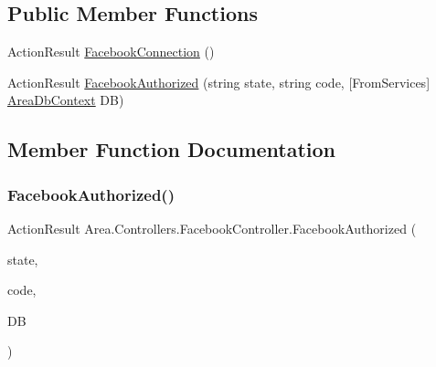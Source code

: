 \subsection*{Public Member Functions}
\begin{DoxyCompactItemize}
\item 
Action\+Result \mbox{\hyperlink{classArea_1_1Controllers_1_1FacebookController_a1218de7760311df99a293d4723414154}{Facebook\+Connection}} ()
\item 
Action\+Result \mbox{\hyperlink{classArea_1_1Controllers_1_1FacebookController_adc0a3bd0afae0028b22767eabb749e37}{Facebook\+Authorized}} (string state, string code, \mbox{[}From\+Services\mbox{]} \mbox{\hyperlink{classArea_1_1DAT_1_1AreaDbContext}{Area\+Db\+Context}} DB)
\end{DoxyCompactItemize}


\subsection{Member Function Documentation}
\mbox{\label{classArea_1_1Controllers_1_1FacebookController_adc0a3bd0afae0028b22767eabb749e37}} 
\subsubsection{\texorpdfstring{Facebook\+Authorized()}{FacebookAuthorized()}}
{\footnotesize\ttfamily Action\+Result Area.\+Controllers.\+Facebook\+Controller.\+Facebook\+Authorized (\begin{DoxyParamCaption}\item[{string}]{state,  }\item[{string}]{code,  }\item[{\mbox{[}\+From\+Services\mbox{]} \mbox{\hyperlink{classArea_1_1DAT_1_1AreaDbContext}{Area\+Db\+Context}}}]{DB }\end{DoxyParamCaption})\hspace{0.3cm}{\ttfamily [inline]}}

\mbox{\label{classArea_1_1Controllers_1_1FacebookController_a1218de7760311df99a293d4723414154}} 
